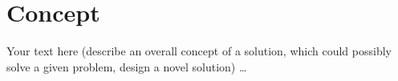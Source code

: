 \chapter{Concept}\label{chap:concept}
\chapterstart

Your text here (describe an overall concept of a solution, which could possibly solve a given problem, design a novel solution) \ldots

\chapterend